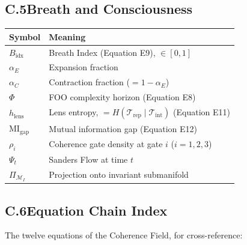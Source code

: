 \documentclass[12pt, openany]{book}
\theoremstyle{remark}
\newcommand{\Tint}{\mathcal{T}_{\mathrm{int}}}
\newcommand{\Trep}{\mathcal{T}_{\mathrm{rep}}}
\begin{document}
\subsection*{C.5\quad Breath and Consciousness}

\begin{center}
\begin{tabular}{lp{10cm}}
\toprule
\textbf{Symbol} & \textbf{Meaning} \\
\midrule
$B_{\mathrm{idx}}$ & Breath Index (Equation E9), $\in [0, 1]$ \\
$\alpha_E$ & Expansion fraction \\
$\alpha_C$ & Contraction fraction ($= 1 - \alpha_E$) \\
$\Phi$ & FOO complexity horizon (Equation E8) \\
$h_{\mathrm{lens}}$ & Lens entropy, $= H(\Trep \mid \Tint)$ (Equation E11) \\
$\mathrm{MI}_{\mathrm{gap}}$ & Mutual information gap (Equation E12) \\
$\rho_i$ & Coherence gate density at gate $i$ ($i = 1, 2, 3$) \\
$\Psi_t$ & Sanders Flow at time $t$ \\
$\Pi_{\mathcal{M}_I}$ & Projection onto invariant submanifold \\
\bottomrule
\end{tabular}
\end{center}

\subsection*{C.6\quad Equation Chain Index}

The twelve equations of the Coherence Field, for cross-reference:
\end{document}
